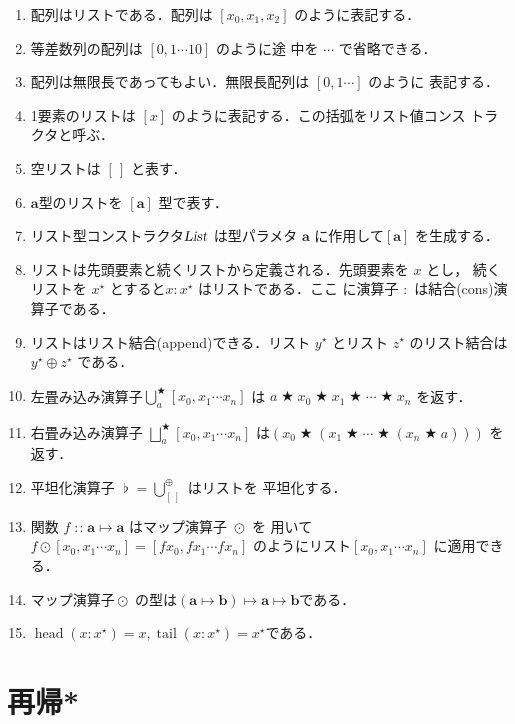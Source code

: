 \documentclass[a5paper,twoside,fleqn,draft]{jsbook}
\newcommand{\mEmptyList}{{[\,]}}
\newcommand{\mSpecialFunc}[1]{#1}
\DeclareMathOperator{\mHead}{\mSpecialFunc{head}}
\DeclareMathOperator{\mTail}{\mSpecialFunc{tail}}
\DeclareMathOperator{\mAppend}{\oplus}
\DeclareMathOperator{\mBinOp}{\bigstar}
\DeclareMathOperator*{\mFold}{\bigcup}
\DeclareMathOperator*{\mFoldRight}{\bigsqcup}
\DeclareMathOperator{\mIn}{{:\!:}}
\DeclareMathOperator{\mJoinList}{\flat} %
\DeclareMathOperator{\mMapList}{\odot}
\DeclareMathOperator{\mMapsTo}{\mapsto}
\newcommand{\mType}[1]{\mathbf{#1}} %
\newcommand{\mA}{\mType{a}}
\newcommand{\mB}{\mType{b}}
\newcommand{\mTypeConstructor}[1]{\textsl{#1}}
\DeclareMathOperator{\mListTypeConstructor}{\mTypeConstructor{List}}
\newcommand{\mList}[1]{{#1}^\mathrm{\star}}
\newcommand{\mProjEXP}[2]{#1\mMapsTo#2} %
\begin{document}
\begin{enumerate}
\item 配列はリストである．配列は $[x_0,x_1,x_2]$ のように表記する．
\item 等差数列の配列は $[0,1\dotsb10]$ のように途
  中を $\dotsb$ で省略できる．
\item 配列は無限長であってもよい．無限長配列は $[0,1\dotsb]$ のように
  表記する．
\item 1要素のリストは $[x]$ のように表記する．この括弧をリスト値コンス
  トラクタと呼ぶ．
\item 空リストは $\mEmptyList$ と表す．
\item $\mA $型のリストを $[\mA]$ 型で表す．
\item リスト型コンストラクタ$\mListTypeConstructor$ は型パラメタ $\mA
  $ に作用して$[\mA]$ を生成する．
\item リストは先頭要素と続くリストから定義される．先頭要素を $x$ とし，
  続くリストを $\mList{x}$ とすると$x:\mList{x}$ はリストである．ここ
  に演算子 $:$ は結合(cons)演算子である．
\item リストはリスト結合(append)できる．リスト $\mList{y}$ とリスト
  $\mList{z}$ のリスト結合は $\mList{y}\mAppend\mList{z}$ である．
\item 左畳み込み演算子$\mFold^{\mBinOp}_a[x_0,x_1\dotsb x_n]$ は
  $a\mBinOp x_0\mBinOp x_1\mBinOp\dotsb\mBinOp x_n$ を返す．
\item 右畳み込み演算子 $\mFoldRight^{\mBinOp}_{a}[x_0,x_1\dotsb x_n]$
  は$(x_0\mBinOp(x_1\mBinOp\dotsb\mBinOp(x_n\mBinOp a)))$ を返す．
\item 平坦化演算子 $\mJoinList=\mFold_\mEmptyList^{\mAppend}$ はリストを
  平坦化する．
\item 関数 $f\mIn\mProjEXP{\mA }{\mA }$ はマップ演算子 $\mMapList$ を
  用いて $f\mMapList[x_0,x_1\dotsb x_n]=[fx_0,fx_1\dotsb
    fx_n]$ のようにリスト$[x_0,x_1\dotsb x_n]$ に適用できる．
\item マップ演算子$\mMapList$ の型は$\mProjEXP{(\mProjEXP{\mA }{\mB
  })}{\mProjEXP{\mA }{\mB }}$である．
\item $\mHead(x:\mList{x})=x,\mTail(x:\mList{x})=\mList{x}$である．
\end{enumerate}


\chapter{再帰*}
\label{ch:recursion}
\end{document}
